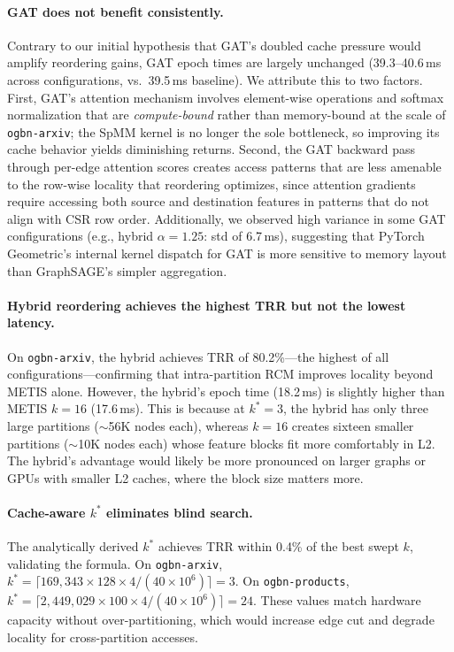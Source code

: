 \documentclass[sigconf,review]{acmart}
\begin{document}
\paragraph{GAT does not benefit consistently.}
Contrary to our initial hypothesis that GAT's doubled cache pressure would amplify reordering gains, GAT epoch times are largely unchanged (39.3--40.6\,ms across configurations, vs.\ 39.5\,ms baseline).
We attribute this to two factors.
First, GAT's attention mechanism involves element-wise operations and softmax normalization that are \emph{compute-bound} rather than memory-bound at the scale of \texttt{ogbn-arxiv}; the SpMM kernel is no longer the sole bottleneck, so improving its cache behavior yields diminishing returns.
Second, the GAT backward pass through per-edge attention scores creates access patterns that are less amenable to the row-wise locality that reordering optimizes, since attention gradients require accessing both source and destination features in patterns that do not align with CSR row order.
Additionally, we observed high variance in some GAT configurations (e.g., hybrid $\alpha{=}1.25$: std of 6.7\,ms), suggesting that PyTorch Geometric's internal kernel dispatch for GAT is more sensitive to memory layout than GraphSAGE's simpler aggregation.

\paragraph{Hybrid reordering achieves the highest TRR but not the lowest latency.}
On \texttt{ogbn-arxiv}, the hybrid achieves TRR of 80.2\%---the highest of all configurations---confirming that intra-partition RCM improves locality beyond METIS alone.
However, the hybrid's epoch time (18.2\,ms) is slightly higher than METIS $k{=}16$ (17.6\,ms).
This is because at $k^*{=}3$, the hybrid has only three large partitions ($\sim$56K nodes each), whereas $k{=}16$ creates sixteen smaller partitions ($\sim$10K nodes each) whose feature blocks fit more comfortably in L2.
The hybrid's advantage would likely be more pronounced on larger graphs or GPUs with smaller L2 caches, where the block size matters more.

\paragraph{Cache-aware $k^*$ eliminates blind search.}
The analytically derived $k^*$ achieves TRR within 0.4\% of the best swept $k$, validating the formula.
On \texttt{ogbn-arxiv}, $k^* = \lceil 169{,}343 \times 128 \times 4 / (40 \times 10^6) \rceil = 3$.
On \texttt{ogbn-products}, $k^* = \lceil 2{,}449{,}029 \times 100 \times 4 / (40 \times 10^6) \rceil = 24$.
These values match hardware capacity without over-partitioning, which would increase edge cut and degrade locality for cross-partition accesses.
\end{document}

